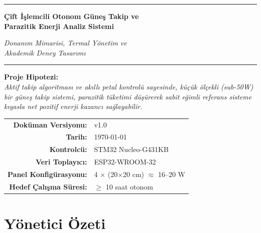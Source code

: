 \documentclass[11pt,a4paper]{article}
\begin{document}
\begin{titlepage}
\centering
\vspace*{2cm}

{\color{primary}\rule{\textwidth}{1.5pt}}
\vspace{0.5cm}

{\Huge\bfseries Çift İşlemcili Otonom Güneş Takip ve\\[0.3cm] Parazitik Enerji Analiz Sistemi\par}
\vspace{0.5cm}

{\Large\itshape Donanım Mimarisi, Termal Yönetim ve\\Akademik Deney Tasarımı\par}
\vspace{0.3cm}
{\color{primary}\rule{\textwidth}{1.5pt}}

\vfill

\begin{tcolorbox}[colback=boxgray,colframe=primary,arc=4pt,width=0.85\textwidth]
\centering
\textbf{Proje Hipotezi:}\\[0.3cm]
\textit{Aktif takip algoritması ve akıllı petal kontrolü sayesinde, küçük ölçekli (sub-50W) bir güneş takip sistemi, parazitik tüketimi düşürerek sabit eğimli referans sisteme kıyasla net pozitif enerji kazancı sağlayabilir.}
\end{tcolorbox}

\vfill

\begin{tabular}{rl}
\textbf{Doküman Versiyonu:} & v1.0 \\
\textbf{Tarih:} & \today \\
\textbf{Kontrolcü:} & STM32 Nucleo-G431KB \\
\textbf{Veri Toplayıcı:} & ESP32-WROOM-32 \\
\textbf{Panel Konfigürasyonu:} & 4 $\times$ (20$\times$20 cm) $\approx$ 16--20 W \\
\textbf{Hedef Çalışma Süresi:} & $\geq$ 10 saat otonom \\
\end{tabular}

\vspace{1cm}
\end{titlepage}

\tableofcontents
\newpage

\section{Yönetici Özeti}
\end{document}
